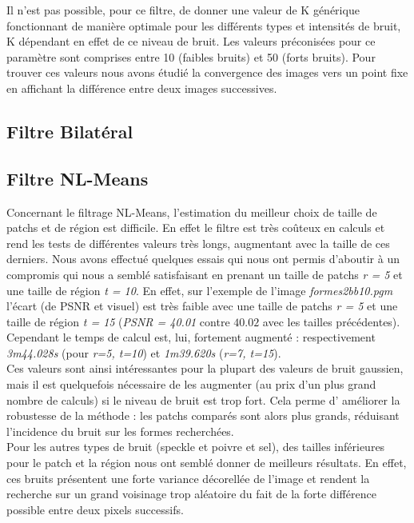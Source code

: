 \documentclass[a4,12pt]{article}
\begin{document}
Il n'est pas possible, pour ce filtre, de donner une valeur de K générique fonctionnant de manière optimale pour les différents types et intensités de bruit, K dépendant en effet de ce niveau de bruit. Les valeurs préconisées pour ce paramètre sont comprises entre  10 (faibles bruits) et 50 (forts bruits). Pour trouver ces valeurs nous avons étudié la convergence des images vers un point fixe en affichant la différence entre deux images successives.
\subsection{Filtre Bilatéral}

\subsection{Filtre NL-Means}
Concernant le filtrage NL-Means, l'estimation du meilleur choix de taille de patchs et de région est difficile. En effet le filtre est très coûteux en calculs et rend les tests de différentes valeurs très longs, augmentant avec la taille de ces derniers. Nous avons effectué quelques essais qui nous ont permis d'aboutir à un compromis qui nous a semblé satisfaisant en prenant un taille de patchs \textit{r = 5} et une taille de région \textit{t = 10}. En effet, sur l'exemple de l'image \textit{formes2bb10.pgm} l'écart (de PSNR et visuel) est très faible avec une taille de patchs \textit{r = 5} et une taille de région \textit{t = 15} (\textit{PSNR = 40.01} contre $40.02$ avec les tailles précédentes). Cependant le temps de calcul est, lui, fortement augmenté : respectivement \textit{3m44.028s} (pour \textit{r=5, t=10}) et \textit{1m39.620s} (\textit{r=7, t=15}).\\

Ces valeurs sont ainsi intéressantes pour la plupart des valeurs de bruit gaussien, mais il est quelquefois nécessaire de les augmenter (au prix d'un plus grand nombre de calculs) si le niveau de bruit est trop fort. Cela perme d' améliorer la robustesse de la méthode : les patchs comparés sont alors plus grands, réduisant l'incidence du bruit sur les formes recherchées.\\

Pour les autres types de bruit (speckle et poivre et sel), des tailles inférieures pour le patch et la région nous ont semblé donner de meilleurs résultats. En effet, ces bruits présentent une forte variance décorellée de l'image et rendent la recherche sur un grand voisinage trop aléatoire du fait de la forte différence possible entre deux pixels successifs.\\
\end{document}
